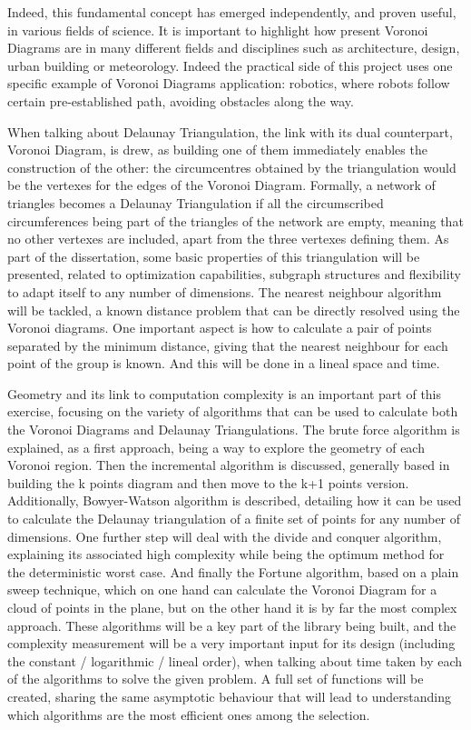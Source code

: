 Indeed, this fundamental concept has emerged independently, and proven useful, in various fields of science. It is important to highlight how present Voronoi Diagrams are in many different fields and disciplines such as architecture, design, urban building or meteorology. Indeed the practical side of this project uses one specific example of Voronoi Diagrams application: robotics, where robots follow certain pre-established path, avoiding obstacles along the way.

When talking about Delaunay Triangulation, the link with its dual counterpart, Voronoi Diagram, is drew, as building one of them immediately enables the construction of the other: the circumcentres obtained by the triangulation would be the vertexes for the edges of the Voronoi Diagram. Formally, a network of triangles becomes a Delaunay Triangulation if all the circumscribed circumferences being part of the triangles of the network are empty, meaning that no other vertexes are included, apart from the three vertexes defining them. As part of the dissertation, some basic properties of this triangulation will be presented, related to optimization capabilities, subgraph structures and flexibility to adapt itself to any number of dimensions. The nearest neighbour algorithm will be tackled, a known distance problem that can be directly resolved using the Voronoi diagrams. One important aspect is how to calculate a pair of points separated by the minimum distance, giving that the nearest neighbour for each point of the group is known. And this will be done in a lineal space and time.



Geometry and its link to computation complexity is an important part of this exercise, focusing on the variety of algorithms that can be used to calculate both the Voronoi Diagrams and Delaunay Triangulations. The brute force algorithm is explained, as a first approach, being a way to explore the geometry of each Voronoi region. Then the incremental algorithm is discussed, generally based in building the k points diagram and then move to the k+1 points version. Additionally, Bowyer-Watson algorithm is described, detailing how it can be used to calculate the Delaunay triangulation of a finite set of points for any number of dimensions. One further step will deal with the divide and conquer algorithm, explaining its associated high complexity while being the optimum method for the deterministic worst case. And finally the Fortune algorithm, based on a plain sweep technique, which on one hand can calculate the Voronoi Diagram for a cloud of points in the plane, but on the other hand it is by far the most complex approach. These algorithms will be a key part of the library being built, and the complexity measurement will be a very important input for its design (including the constant / logarithmic / lineal order), when talking about time taken by each of the algorithms to solve the given problem. A full set of functions will be created, sharing the same asymptotic behaviour that will lead to understanding which algorithms are the most efficient ones among the selection. 

